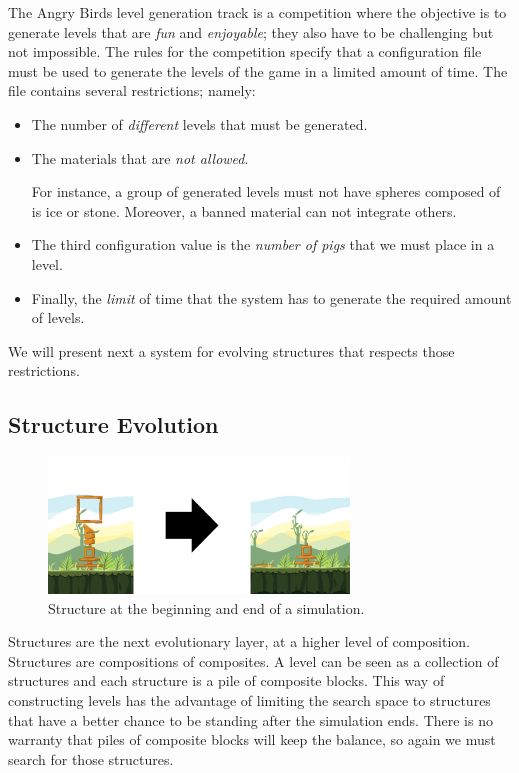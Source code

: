 \documentclass[conference]{IEEEtran}
\begin{document}
The Angry Birds level generation track is a competition where the objective is
to generate levels that are \textit{fun} and \textit{enjoyable}; they also have
to be challenging but not impossible. The rules for the competition specify that
a configuration file must be used to generate the levels of the game in a
limited amount of time. The file contains several restrictions;
namely:\begin{itemize}
\item   The number of \textit{different}
levels that must be generated. 
\item The materials that are \textit{not allowed}.

For instance, a group of generated levels must not have spheres composed of  is
ice or stone. Moreover, a banned material can not integrate others. 
\item The third configuration value is the \textit{number of pigs} that we must
place in a level. 
\item Finally, the \textit{limit} of time that the system has to generate the
required amount of levels.
\end{itemize}

We will present next a system for evolving structures that respects those restrictions.

\subsection{Structure Evolution}
   
    \begin{figure}[htbp]
    \centerline{\includegraphics[width=80mm]{Images/simulation_bef_aft_example.png}}
    \caption{Structure at the beginning and end of a simulation.}
    \label{test_old}
    \end{figure}
Structures are the next evolutionary layer, at a higher level of composition.
Structures are compositions of composites. A level can be seen as a collection 
of structures and each structure is a pile of composite blocks. This way of 
constructing levels has the advantage of
limiting the search space to structures that have a better chance to be 
standing after the simulation ends. There is no warranty that piles of 
composite blocks will keep the balance, so again we must search for those 
structures.
\end{document}
